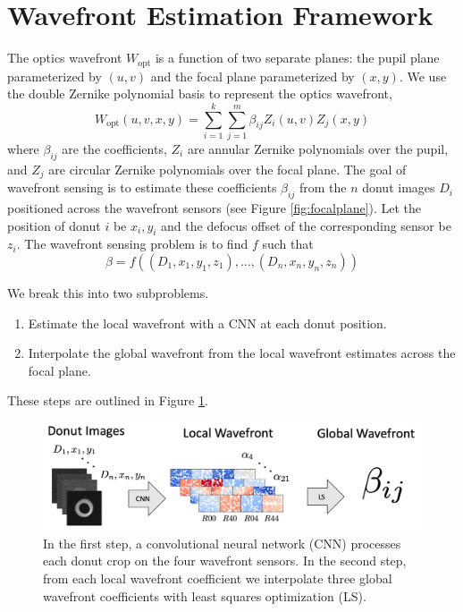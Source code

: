\section{Wavefront Estimation Framework}
\label{sec:decomposing}

The optics wavefront $W_{\text{opt}}$ is a function of two separate planes: the pupil plane parameterized by $(u,v)$ and the focal plane parameterized by $(x,y)$. We use the double Zernike polynomial basis \cite{doublezernike} to represent the optics wavefront, 
\begin{equation}W_{\text{opt}}(u,v,x,y) = \sum_{i=1}^k\sum_{j=1}^m\beta_{ij}Z_i(u,v)Z_j(x,y)\end{equation}
\noindent where $\beta_{ij}$ are the coefficients, $Z_i$ are annular Zernike polynomials over the pupil, and $Z_j$ are circular Zernike polynomials over the focal plane. The goal of wavefront sensing is to estimate these coefficients $\beta_{ij}$ from the $n$ donut images $D_i$ positioned across the wavefront sensors (see Figure \ref{fig:focalplane}). Let the position of donut $i$ be $x_i,y_i$ and the defocus offset of the corresponding sensor be $z_i$. The wavefront sensing problem is to find $f$ such that
\begin{equation}\beta = f((D_1,x_1, y_1, z_1), \dots, (D_n, x_n, y_n, z_n))\end{equation}

We break this into two subproblems.

\begin{enumerate}
	\item Estimate the local wavefront with a CNN at each donut position.
	\item Interpolate the global wavefront from the local wavefront estimates across the focal plane.
\end{enumerate}

\noindent These steps are outlined in Figure \ref{fig:twostep}. 

\begin{figure}[hbt!]
\centering
\includegraphics[width=14cm, keepaspectratio]{figs/new_paradigm/twostep.png}
\caption[Two Step Approach To Wavefront Sensing]{In the first step, a convolutional neural network (CNN) processes each donut crop on the four wavefront sensors. In the second step, from each local wavefront coefficient we interpolate three global wavefront coefficients with least squares optimization (LS).}
\label{fig:twostep}
\end{figure}

